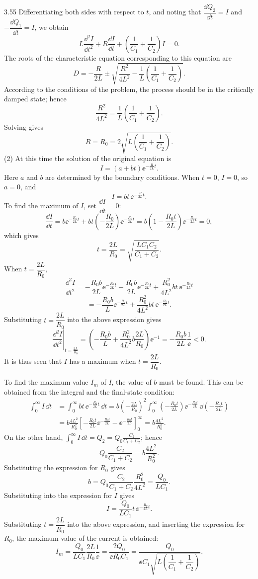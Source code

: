 \begin{solution}{3.55}
Differentiating both sides with respect to $t$, and noting that $\dfrac{\dd Q_2}{\dd t}=I$ and $-\dfrac{\dd Q_1}{\dd t}=I$, we obtain
\[
L\frac{\dd^2I}{\dd t^2}+R\frac{\dd I}{\dd t}+\left(\frac{1}{C_1}+\frac{1}{C_2}\right)I=0.
\]
The roots of the characteristic equation corresponding to this equation are
\[
D=-\frac{R}{2L}\pm\sqrt{\frac{R^2}{4L^2}-\frac{1}{L}\left(\frac{1}{C_1}+\frac{1}{C_2}\right)}.
\]
According to the conditions of the problem, the process should be in the critically damped state; hence
\[
\frac{R^2}{4L^2}=\frac{1}{L}\left(\frac{1}{C_1}+\frac{1}{C_2}\right).
\]
Solving gives
\[
R=R_0=2\sqrt{L\left(\frac{1}{C_1}+\frac{1}{C_2}\right)}.
\]
(2) At this time the solution of the original equation is
\[
I=(a+bt)\ee^{-\frac{R}{2L}t}.
\]
Here $a$ and $b$ are determined by the boundary conditions. When $t=0$, $I=0$, so $a=0$, and
\[
I=bt\,\ee^{-\frac{R}{2L}t}.
\]
To find the maximum of $I$, set $\dfrac{\dd I}{\dd t}=0$:
\[
\frac{\dd I}{\dd t}=b\ee^{-\frac{R_0}{2L}t}+bt\left(-\frac{R_0}{2L}\right)\ee^{-\frac{R_0}{2L}t}
=b\left(1-\frac{R_0t}{2L}\right)\ee^{-\frac{R_0}{2L}t}=0,
\]
which gives
\[
t=\frac{2L}{R_0}=\sqrt{\frac{LC_1C_2}{C_1+C_2}}.
\]
When $t=\dfrac{2L}{R_0}$,
\[
\frac{\dd^2I}{\dd t^2}
=-\frac{R_0b}{2L}\ee^{-\frac{R_0}{2L}t}-\frac{R_0b}{2L}\ee^{-\frac{R_0}{2L}t}
+\frac{R_0^2}{4L^2}bt\,\ee^{-\frac{R_0}{2L}t}
\]
\[
=-\frac{R_0b}{L}\ee^{-\frac{R_0}{2L}t}+\frac{R_0^2}{4L^2}bt\,\ee^{-\frac{R_0}{2L}t}.
\]
Substituting $t=\dfrac{2L}{R_0}$ into the above expression gives
\[
\left.\frac{\dd^2I}{\dd t^2}\right|_{t=\frac{2L}{R_0}}
=\left(-\frac{R_0b}{L}+\frac{R_0^2}{4L^2}b\frac{2L}{R_0}\right)\ee^{-1}
=-\frac{R_0b}{2L}\frac{1}{\ee}<0.
\]
It is thus seen that $I$ has a maximum when $t=\dfrac{2L}{R_0}$.

To find the maximum value $I_m$ of $I$, the value of $b$ must be found. This can be obtained from the integral and the final-state condition:
\begin{align*}
\int_0^\infty I\,\dd t&=\int_0^\infty bt\,\ee^{-\frac{R_0}{2L}t}\,\dd t
=b\left(-\frac{2L}{R_0}\right)^2\int_0^\infty\left(-\frac{R_0t}{2L}\right)\ee^{-\frac{R_0t}{2L}}\,\dd\left(-\frac{R_0t}{2L}\right)\\
&=b\frac{4L^2}{R_0^2}\left[-\frac{R_0t}{2L}\ee^{-\frac{R_0t}{2L}}-\ee^{-\frac{R_0t}{2L}}\right]_0^\infty
=b\frac{4L^2}{R_0^2}.
\end{align*}
On the other hand, $\displaystyle\int_0^\infty I\,\dd t=Q_2=Q_0\frac{C_2}{C_1+C_2}$; hence
\[
Q_0\frac{C_2}{C_1+C_2}=b\frac{4L^2}{R_0^2}.
\]
Substituting the expression for $R_0$ gives
\[
b=Q_0\frac{C_2}{C_1+C_2}\frac{R_0^2}{4L^2}=\frac{Q_0}{LC_1}.
\]
Substituting into the expression for $I$ gives
\[
I=\frac{Q_0}{LC_1}t\,\ee^{-\frac{R_0}{2L}t}.
\]
Substituting $t=\dfrac{2L}{R_0}$ into the above expression, and inserting the expression for $R_0$, the maximum value of the current is obtained:
\[
I_m=\frac{Q_0}{LC_1}\frac{2L}{R_0}\frac{1}{\ee}
=\frac{2Q_0}{\ee R_0C_1}
=\frac{Q_0}{\ee C_1\sqrt{L\left(\dfrac{1}{C_1}+\dfrac{1}{C_2}\right)}}.
\]
\end{solution}

